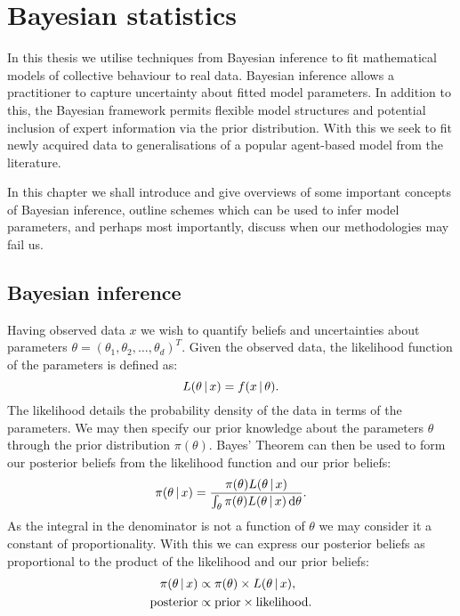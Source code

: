 \graphicspath{{fig/bayes_intro/}}

\chapter{Bayesian statistics}
\label{cha:bayes_intro}

In this thesis we utilise techniques from Bayesian inference to fit mathematical models of
collective behaviour to real data. Bayesian inference allows a practitioner to capture
uncertainty about fitted model parameters. In addition to this, the Bayesian framework
permits flexible model structures and potential inclusion of expert information via the
prior distribution. With this we seek to fit newly acquired data to generalisations of a
popular agent-based model from the literature.

In this chapter we shall introduce and give overviews of some important concepts of
Bayesian inference, outline schemes which can be used to infer model parameters, and
perhaps most importantly, discuss when our methodologies may fail us.

\section{Bayesian inference}
\label{sec:bayesian_inference}

Having observed data $x$ we wish to quantify beliefs and uncertainties about
parameters $\theta = (\theta_1,\theta_2,\dots,\theta_d)^T$. Given the observed data,
the likelihood function of the parameters is defined as:
\begin{equation}
  L(\theta \,|\, x) = f(x \,|\,\theta).
\end{equation}
The likelihood details the probability density of the data in terms of the parameters. We
may then specify our prior knowledge about the parameters $\theta$ through the prior
distribution $\pi(\theta)$. Bayes' Theorem can then be used to form our posterior
beliefs from the likelihood function and our prior beliefs:
\begin{equation}
  \label{eq:bayes_theorem}
  \pi(\theta \given x) =
    \frac{\pi(\theta) L(\theta\given x)}%
         {\int_{\theta} \pi(\theta) L(\theta\given x) \, \textup{d}\theta}.
\end{equation}
As the integral in the denominator is not a function of $\theta$ we may consider it a
constant of proportionality. With this we can express our posterior beliefs as
proportional to the product of the likelihood and our prior beliefs:
\begin{align*}
  \pi(\theta\,|\, x) & \propto \pi(\theta) \times L(\theta\,|\, x), \\
  \text{posterior}             & \propto \text{prior} \times \text{likelihood}.
\end{align*}

